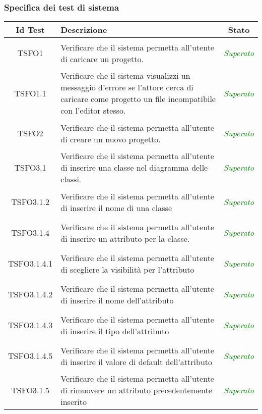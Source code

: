 \subsubsection{Specifica dei test di sistema}
\normalsize
\begin{longtable}{|c|>{}m{8cm}|c|}
\hline 
\textbf{Id Test} & \textbf{Descrizione} & \textbf{Stato}\\
\hline
\endhead
\hypertarget{TSFO1}{TSFO1} & Verificare che il sistema permetta all'utente di caricare un progetto. & \textcolor{Green}{\textit{Superato}}\\ \hline
\hypertarget{TSFO1.1}{TSFO1.1} & Verificare che il sistema visualizzi un messaggio d'errore se l'attore cerca di caricare come progetto un file incompatibile con l'editor stesso. & \textcolor{Green}{\textit{Superato}}\\ \hline
\hypertarget{TSFO2}{TSFO2} & Verificare che il sistema permetta all'utente di creare un nuovo progetto. & \textcolor{Green}{\textit{Superato}}\\ \hline
\hypertarget{TSFO3.1}{TSFO3.1} & Verificare che il sistema permetta all'utente di inserire una classe nel diagramma delle classi. & \textcolor{Green}{\textit{Superato}}\\ \hline
\hypertarget{TSFO3.1.2}{TSFO3.1.2} & Verificare che il sistema permetta all'utente di inserire il nome di una classe & \textcolor{Green}{\textit{Superato}}\\ \hline
\hypertarget{TSFO3.1.4}{TSFO3.1.4} & Verificare che il sistema permetta all'utente di inserire un attributo per la classe. & \textcolor{Green}{\textit{Superato}}\\ \hline
\hypertarget{TSFO3.1.4.1}{TSFO3.1.4.1} & Verificare che il sistema permetta all'utente di scegliere la visibilità per l'attributo & \textcolor{Green}{\textit{Superato}}\\ \hline
\hypertarget{TSFO3.1.4.2}{TSFO3.1.4.2} & Verificare che il sistema permetta all'utente di inserire il nome dell'attributo & \textcolor{Green}{\textit{Superato}}\\ \hline
\hypertarget{TSFO3.1.4.3}{TSFO3.1.4.3} & Verificare che il sistema permetta all'utente di inserire il tipo dell'attributo & \textcolor{Green}{\textit{Superato}}\\ \hline
\hypertarget{TSFO3.1.4.5}{TSFO3.1.4.5} & Verificare che il sistema permetta all'utente di inserire il valore di default dell'attributo & \textcolor{Green}{\textit{Superato}}\\ \hline
\hypertarget{TSFO3.1.5}{TSFO3.1.5} & Verificare che il sistema permetta all'utente di rimuovere un attributo precedentemente inserito & \textcolor{Green}{\textit{Superato}}\\ \hline

\end{longtable}
